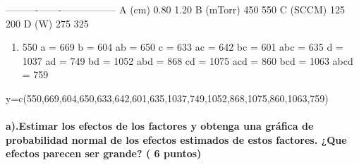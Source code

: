 \documentclass[]{article}
\providecommand{\tightlist}{%
  \setlength{\itemsep}{0pt}\setlength{\parskip}{0pt}}
\let\oldparagraph\paragraph
\renewcommand{\paragraph}[1]{\oldparagraph{#1}\mbox{}}
\begin{document}
----------\textbar{}-------\textbar{}----------------- A (cm) \textbar{}
0.80 \textbar{} 1.20 B (mTorr) \textbar{} 450 \textbar{} 550 C (SCCM)
\textbar{} 125 \textbar{} 200 D (W) \textbar{} 275 \textbar{} 325

\begin{enumerate}
\def\labelenumi{(\arabic{enumi})}
\tightlist
\item
  550 a = 669 b = 604 ab = 650 c = 633 ac = 642 bc = 601 abc = 635 d =
  1037 ad = 749 bd = 1052 abd = 868 cd = 1075 acd = 860 bcd = 1063 abcd
  = 759
\end{enumerate}

y=c(550,669,604,650,633,642,601,635,1037,749,1052,868,1075,860,1063,759)

\hypertarget{a.estimar-los-efectos-de-los-factores-y-obtenga-una-grafica-de-probabilidad-normal-de-los-efectos-estimados-de-estos-factores.-que-efectos-parecen-ser-grande-6-puntos}{%
\paragraph{a).Estimar los efectos de los factores y obtenga una gráfica
de probabilidad normal de los efectos estimados de estos factores. ¿Que
efectos parecen ser grande? ( 6
puntos)}\label{a.estimar-los-efectos-de-los-factores-y-obtenga-una-grafica-de-probabilidad-normal-de-los-efectos-estimados-de-estos-factores.-que-efectos-parecen-ser-grande-6-puntos}}
\end{document}
